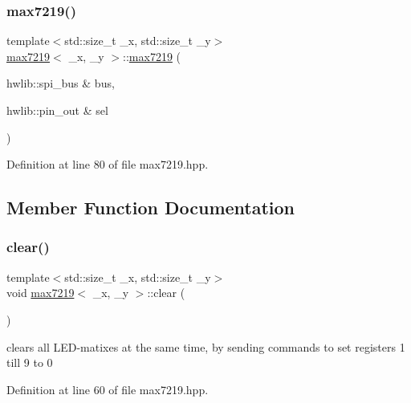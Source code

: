 \subsubsection{\texorpdfstring{max7219()}{max7219()}}
{\footnotesize\ttfamily template$<$std\+::size\+\_\+t \+\_\+x, std\+::size\+\_\+t \+\_\+y$>$ \\
\mbox{\hyperlink{classmax7219}{max7219}}$<$ \+\_\+x, \+\_\+y $>$\+::\mbox{\hyperlink{classmax7219}{max7219}} (\begin{DoxyParamCaption}\item[{hwlib\+::spi\+\_\+bus \&}]{bus,  }\item[{hwlib\+::pin\+\_\+out \&}]{sel }\end{DoxyParamCaption})\hspace{0.3cm}{\ttfamily [inline]}}



Definition at line 80 of file max7219.\+hpp.



\subsection{Member Function Documentation}
\mbox{\label{classmax7219_a51d0384d961359235b9a159f4d1a3752}} 
\subsubsection{\texorpdfstring{clear()}{clear()}}
{\footnotesize\ttfamily template$<$std\+::size\+\_\+t \+\_\+x, std\+::size\+\_\+t \+\_\+y$>$ \\
void \mbox{\hyperlink{classmax7219}{max7219}}$<$ \+\_\+x, \+\_\+y $>$\+::clear (\begin{DoxyParamCaption}{ }\end{DoxyParamCaption})\hspace{0.3cm}{\ttfamily [inline]}}



clears all L\+E\+D-\/matixes at the same time, by sending commands to set registers 1 till 9 to 0 



Definition at line 60 of file max7219.\+hpp.

\mbox{\label{classmax7219_a9bc3ca9df2c623b75596c90c32328c73}} 
